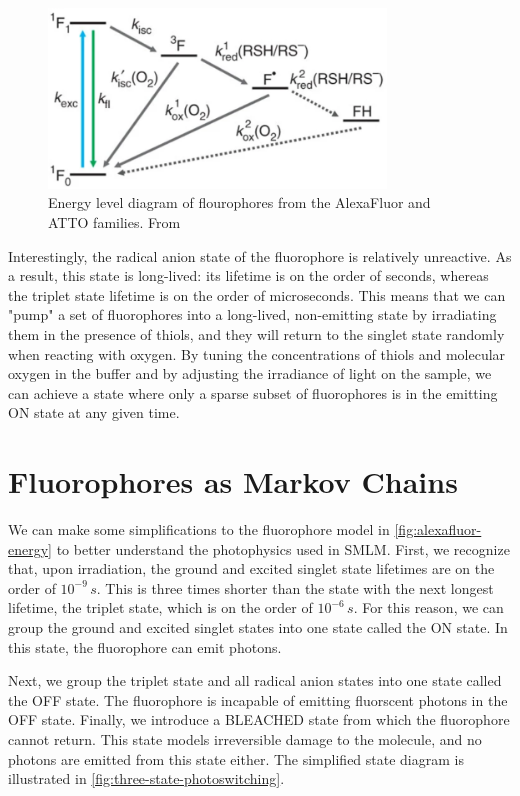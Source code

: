 \documentclass[10pt,a4paper,oneside]{book}
\begin{document}
\begin{figure}[ht]
    \centering
    \includegraphics[width=0.8\textwidth]{alexafluor-jablonski-diagram.png}
    \caption{Energy level diagram of flourophores from the AlexaFluor and ATTO families. From \cite{vandelinde-natureprotocols-2011}}
    \label{fig:alexafluor-energy}
\end{figure}

Interestingly, the radical anion state of the fluorophore is relatively unreactive. As a result, this state is long-lived: its lifetime is on the order of seconds, whereas the triplet state lifetime is on the order of microseconds. This means that we can "pump" a set of fluorophores into a long-lived, non-emitting state by irradiating them in the presence of thiols, and they will return to the singlet state randomly when reacting with oxygen. By tuning the concentrations of thiols and molecular oxygen in the buffer and by adjusting the irradiance of light on the sample, we can achieve a state where only a sparse subset of fluorophores is in the emitting ON state at any given time.

\section{Fluorophores as Markov Chains}

We can make some simplifications to the fluorophore model in \autoref{fig:alexafluor-energy} to better understand the photophysics used in SMLM. First, we recognize that, upon irradiation, the ground and excited singlet state lifetimes are on the order of $10^{-9} \, s$. This is three times shorter than the state with the next longest lifetime, the triplet state, which is on the order of $10^{-6} \, s$. For this reason, we can group the ground and excited singlet states into one state called the ON state. In this state, the fluorophore can emit photons.

Next, we group the triplet state and all radical anion states into one state called the OFF state. The fluorophore is incapable of emitting fluorscent photons in the OFF state. Finally, we introduce a BLEACHED state from which the fluorophore cannot return. This state models irreversible damage to the molecule, and no photons are emitted from this state either. The simplified state diagram is illustrated in \autoref{fig:three-state-photoswitching}.
\end{document}
